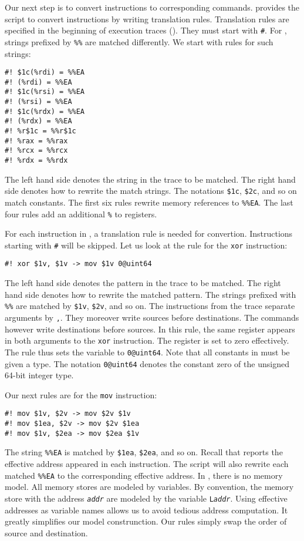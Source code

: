 \documentclass{amsproc}
\begin{document}
Our next step is to convert \xeightysix instructions to corresponding
\cryptoline commands. \cryptoline provides the \python script \tozdsl
to convert instructions by writing translation rules. Translation
rules are specified in the beginning of execution traces
(\nistzaddgas). They must start with \texttt{\#\!}. For \tozdsl,
strings prefixed by \texttt{\%\%} are matched differently. We start
with rules for such strings:
\begin{verbatim}
#! $1c(%rdi) = %%EA
#! (%rdi) = %%EA
#! $1c(%rsi) = %%EA
#! (%rsi) = %%EA
#! $1c(%rdx) = %%EA
#! (%rdx) = %%EA
#! %r$1c = %%r$1c
#! %rax = %%rax
#! %rcx = %%rcx
#! %rdx = %%rdx
\end{verbatim}
The left hand side denotes the string in the trace to be matched. The
right hand side denotes how to rewrite the match strings. The notations
\texttt{\$1c}, \texttt{\$2c}, and so on match constants. The first six
rules rewrite memory references to \texttt{\%\%EA}. The last four
rules add an additional \texttt{\%} to registers.

For each \xeightysix instruction in \nistzaddgas, a translation rule is
needed for convertion. Instructions starting with \texttt{\#} will be
skipped. Let us look at the rule for the \xeightysix \texttt{xor} instruction:
\begin{verbatim}
#! xor $1v, $1v -> mov $1v 0@uint64
\end{verbatim}
The left hand side denotes the pattern in the trace to be matched. The
right hand side denotes how to rewrite the matched pattern. The strings
prefixed with \texttt{\%\%} are matched by \texttt{\$1v},
\texttt{\$2v}, and so on. The \xeightysix instructions from the trace
separate arguments by \texttt{,}. They moreover write sources before
destinations. The \cryptoline commands however write destinations
before sources. In this rule, the same register appears in both
arguments to the \texttt{xor} instruction. The register is set to
zero effectively. The rule thus sets the \cryptoline variable to
\texttt{0@uint64}. Note that all constants in \cryptoline must be
given a type. The notation \texttt{0@uint64} denotes the constant zero
of the unsigned 64-bit integer type.

Our next rules are for the \xeightysix \texttt{mov} instruction:
\begin{verbatim}
#! mov $1v, $2v -> mov $2v $1v
#! mov $1ea, $2v -> mov $2v $1ea
#! mov $1v, $2ea -> mov $2ea $1v
\end{verbatim}
The string \texttt{\%\%EA} is matched by \texttt{\$1ea},
\texttt{\$2ea}, and so on. Recall that \itrace reports the effective
address appeared in each instruction. The script \tozdsl will also
rewrite each matched \texttt{\%\%EA} to the corresponding effective
address. In \cryptoline, there is no memory model. All memory stores
are modeled by \cryptoline variables. By convention, the memory store
with the address \texttt{\textit{addr}} are modeled by the variable 
\texttt{L\textit{addr}}. Using effective addresses as variable names
allows us to avoid tedious address computation. It greatly simplifies
our model construnction. Our rules simply swap the order of source and
destination.
\end{document}
